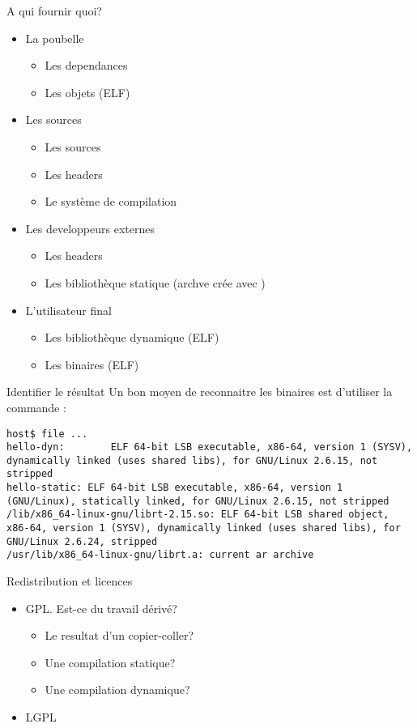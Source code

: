 \begin{frame}[fragile=singleslide]{A qui fournir quoi?}
  \begin{itemize}
  \item La poubelle
    \begin{itemize}
    \item Les dependances
    \item Les objets (ELF)
    \end{itemize}
  \item Les sources
    \begin{itemize}
    \item Les sources
    \item Les headers
    \item Le système de compilation
    \end{itemize}
  \item Les developpeurs externes
    \begin{itemize}
    \item Les headers
    \item Les bibliothèque statique (archve crée avec )
    \end{itemize}
  \item L'utilisateur final
    \begin{itemize}
    \item Les bibliothèque dynamique (ELF)
    \item Les binaires (ELF)
    \end{itemize}
  \end{itemize}
\end{frame}

\begin{frame}[fragile=singleslide]{Identifier le résultat}
  Un bon moyen de reconnaitre  les binaires est d'utiliser la commande
  :
  \begin{lstlisting}
host$ file ...
hello-dyn:        ELF 64-bit LSB executable, x86-64, version 1 (SYSV), dynamically linked (uses shared libs), for GNU/Linux 2.6.15, not stripped
hello-static: ELF 64-bit LSB executable, x86-64, version 1 (GNU/Linux), statically linked, for GNU/Linux 2.6.15, not stripped
/lib/x86_64-linux-gnu/librt-2.15.so: ELF 64-bit LSB shared object, x86-64, version 1 (SYSV), dynamically linked (uses shared libs), for GNU/Linux 2.6.24, stripped
/usr/lib/x86_64-linux-gnu/librt.a: current ar archive
\end{lstlisting} %
\end{frame}

\begin{frame}[fragile=singleslide]{Redistribution et licences}
  \begin{itemize}
  \item GPL. Est-ce du travail dérivé?
    \begin{itemize}
    \item Le resultat d'un copier-coller?
    \item Une compilation statique?
    \item Une compilation dynamique?
    \end{itemize}
  \item LGPL
  \end{itemize}
\end{frame}

